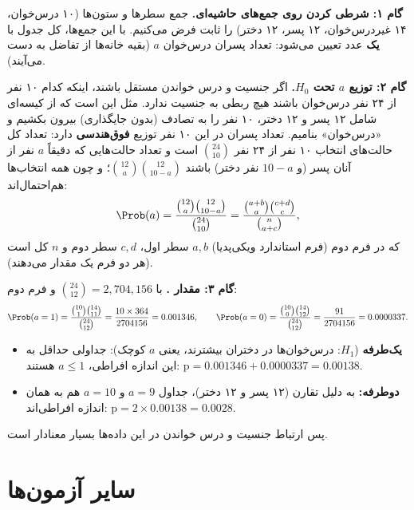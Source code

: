 \textbf{گام ۱: شرطی کردن روی جمع‌های حاشیه‌ای.} جمع سطرها و ستون‌ها (۱۰ درس‌خوان، ۱۴ غیردرس‌خوان، ۱۲ پسر، ۱۲ دختر) را ثابت فرض می‌کنیم. با این جمع‌ها، کل جدول با \textbf{یک} عدد تعیین می‌شود: تعداد پسران درس‌خوان $a$ (بقیه خانه‌ها از تفاضل به دست می‌آیند).

\textbf{گام ۲: توزیع $a$ تحت $H_0$.} اگر جنسیت و درس خواندن مستقل باشند، اینکه کدام ۱۰ نفر از ۲۴ نفر درس‌خوان باشند هیچ ربطی به جنسیت ندارد. مثل این است که از کیسه‌ای شامل ۱۲ پسر و ۱۲ دختر، ۱۰ نفر را به تصادف (بدون جایگذاری) بیرون بکشیم و «درس‌خوان» بنامیم. تعداد پسران در این ۱۰ نفر توزیع \textbf{فوق‌هندسی} دارد: تعداد کل حالت‌های انتخاب ۱۰ نفر از ۲۴ نفر $\binom{24}{10}$ است و تعداد حالت‌هایی که دقیقاً $a$ نفر از آنان پسر (و $10-a$ نفر دختر) باشند $\binom{12}{a}\binom{12}{10-a}$؛ و چون همه انتخاب‌ها هم‌احتمال‌اند:
\[
\Prob(a)=\frac{\binom{12}{a}\binom{12}{10-a}}{\binom{24}{10}}
=\frac{\binom{a+b}{a}\binom{c+d}{c}}{\binom{n}{a+c}},
\]
که در فرم دوم (فرم استاندارد ویکی‌پدیا) $a,b$ سطر اول، $c,d$ سطر دوم و $n$ کل است (هر دو فرم یک مقدار می‌دهند).

\textbf{گام ۳: مقدار .} با $\binom{24}{12}=2{,}704{,}156$ و فرم دوم:
\[
\Prob(a=1)=\frac{\binom{10}{1}\binom{14}{11}}{\binom{24}{12}}=\frac{10\times364}{2704156}=0.001346,\qquad
\Prob(a=0)=\frac{\binom{10}{0}\binom{14}{12}}{\binom{24}{12}}=\frac{91}{2704156}=0.0000337 .
\]
\begin{itemize}
\item \textbf{یک‌طرفه} ($H_1$: درس‌خوان‌ها در دختران بیشترند، یعنی $a$ کوچک): جداولی حداقل به این اندازه افراطی، $a\le1$ هستند: $\text{p}=0.001346+0.0000337=0.00138$.
\item \textbf{دوطرفه:} به دلیل تقارن (۱۲ پسر و ۱۲ دختر)، جداول $a=9$ و $a=10$ هم به همان اندازه افراطی‌اند: $\text{p}=2\times0.00138=0.0028$.
\end{itemize}
پس ارتباط جنسیت و درس خواندن در این داده‌ها بسیار معنادار است.

\section{سایر آزمون‌ها}

